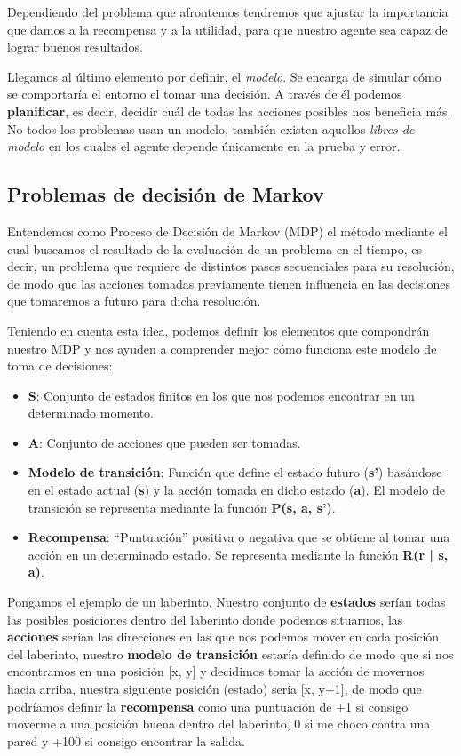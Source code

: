 Dependiendo del problema que afrontemos tendremos que ajustar la importancia que damos a la recompensa y a la utilidad, para que nuestro agente sea capaz de lograr buenos resultados.

Llegamos al último elemento por definir, el \textit{modelo}. Se encarga de simular cómo se comportaría el entorno el tomar una decisión. A través de él podemos \textbf{planificar}, es decir, decidir cuál de todas las acciones posibles nos beneficia más. No todos los problemas usan un modelo, también existen aquellos \textit{libres de modelo} en los cuales el agente depende únicamente en la prueba y error. 

\subsection{Problemas de decisión de Markov}

Entendemos como Proceso de Decisión de Markov (MDP) el método mediante el cual buscamos el resultado de la evaluación de un problema en el tiempo, es decir, un problema que requiere de distintos pasos secuenciales para su resolución, de modo que las acciones tomadas previamente tienen influencia en las decisiones que tomaremos a futuro para dicha resolución.

Teniendo en cuenta esta idea, podemos definir los elementos que compondrán nuestro MDP y nos ayuden a comprender mejor cómo funciona este modelo de toma de decisiones:

\begin{itemize}
    \item \textbf{S}: Conjunto de estados finitos en los que nos podemos encontrar en un determinado momento.
    \item \textbf{A}: Conjunto de acciones que pueden ser tomadas.
    \item \textbf{Modelo de transición}: Función que define el estado futuro (\textbf{s'}) basándose en el estado actual (\textbf{s}) y la acción tomada en dicho estado (\textbf{a}). El modelo de transición se representa mediante la función \textbf{P(s, a, s’)}.
    \item \textbf{Recompensa}: “Puntuación” positiva o negativa que se obtiene al tomar una acción en un determinado estado. Se representa mediante la función \textbf{R(r | s, a)}.
\end{itemize}

Pongamos el ejemplo de un laberinto. Nuestro conjunto de \textbf{estados} serían todas las posibles posiciones dentro del laberinto donde podemos situarnos, las \textbf{acciones} serían las direcciones en las que nos podemos mover en cada posición del laberinto, nuestro \textbf{modelo de transición} estaría definido de modo que si nos encontramos en una posición [x, y] y decidimos tomar la acción de movernos hacia arriba, nuestra siguiente posición (estado) sería [x, y+1], de modo que podríamos definir la  \textbf{recompensa} como una puntuación de +1 si consigo moverme a una posición buena dentro del laberinto, 0 si me choco contra una pared y +100 si consigo encontrar la salida.

